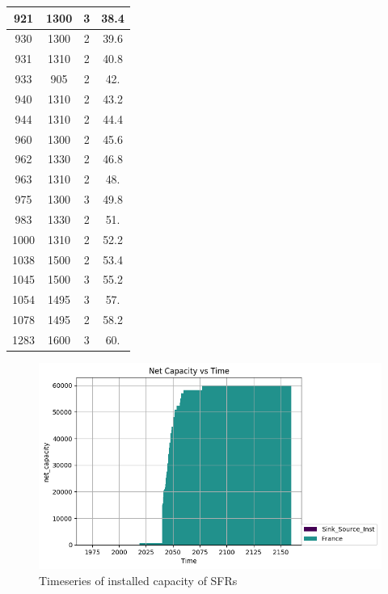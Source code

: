 \begin{table}[h]
\begin{tabular}{|c|c|c|c|}
		921 & 1300 & 3 & 38.4 \\ \hline
		930 & 1300 & 2 & 39.6 \\ \hline
		931 & 1310 & 2 & 40.8 \\ \hline
		933 & 905 & 2 & 42. \\ \hline
		940 & 1310 & 2 & 43.2 \\ \hline
		944 & 1310 & 2 & 44.4 \\ \hline
		960 & 1300 & 2 & 45.6 \\ \hline
		962 & 1330 & 2 & 46.8 \\ \hline
		963 & 1310 & 2 & 48. \\ \hline
		975 & 1300 & 3 & 49.8 \\ \hline
		983 & 1330 & 2 & 51. \\ \hline
		1000 & 1310 & 2 & 52.2 \\ \hline
		1038 & 1500 & 2 & 53.4 \\ \hline
		1045 & 1500 & 3 & 55.2 \\ \hline
		1054 & 1495 & 3 & 57. \\ \hline
		1078 & 1495 & 2 & 58.2 \\ \hline
		1283 & 1600 & 3 & 60. \\ \hline
		
		\end{tabular}
\end{table}


\begin{figure}[htbp!]
	\begin{center}
		\includegraphics{./images/power_plot.png}
	\end{center}
	\caption{Timeseries of installed capacity of \gls{SFR}s}
	\label{fig:sfr_cap}
\end{figure}


